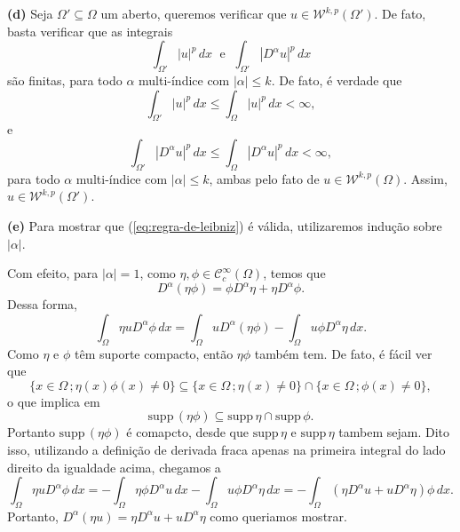 \documentclass[a4paper, 11pt]{book}
\theoremstyle{definition}
\newcommand{\cC}{\mathcal{C}}
\newcommand{\cW}{\mathcal{W}}
\newcommand{\supp}{\mathrm{supp}\,}
\begin{document}
\begin{prf}
    \textbf{(d)} Seja $\Omega' \subseteq \Omega$ um aberto, queremos verificar que $u \in \cW^{k,p}(\Omega')$.
    De fato, basta verificar que as integrais
    \[
        \int_{\Omega'} |u|^p \, dx \;\text{ e }\; \int_{\Omega'} |D^{\alpha}u|^p \, dx
    \]
    são finitas, para todo $\alpha$ multi-índice com $|\alpha| \leqslant k$. De fato, é verdade que
    \[
        \int_{\Omega'} |u|^p \, dx \leqslant \int_{\Omega} |u|^p \,dx < \infty,
    \]
    e
    \[
        \int_{\Omega'} |D^\alpha u|^p \, dx \leqslant \int_{\Omega} |D^\alpha u|^p \,dx < \infty,
    \]
    para todo $\alpha$ multi-índice com $|\alpha| \leqslant k$, ambas pelo fato de $u \in \cW^{k,p}(\Omega)$.
    Assim, $u \in \cW^{k,p}(\Omega')$.

    \textbf{(e)} Para mostrar que (\ref{eq:regra-de-leibniz}) é válida, utilizaremos indução sobre $|\alpha|$. 
    
    Com efeito, para $|\alpha|= 1$, como $\eta,\phi \in \cC^{\infty}_c(\Omega)$, temos que
    \[
        D^{\alpha} (\eta \phi) = \phi D^{\alpha}\eta + \eta D^{\alpha} \phi.
    \]
    Dessa forma,
    \[
        \int_\Omega \eta u D^{\alpha} \phi \, dx = \int_\Omega u D^{\alpha} (\eta \phi) - \int_\Omega u\phi D^{\alpha} \eta \, dx.
    \]
    Como $\eta$ e $\phi$ têm suporte compacto, então $\eta\phi$ também tem.
    De fato, é fácil ver que
    \[
        \{x \in \Omega \,; \eta(x)\phi(x) \neq 0\} \subseteq \{x \in \Omega \,; \eta(x) \neq 0\} \cap \{x \in \Omega \,; \phi(x) \neq 0\},
    \] 
    o que implica em
    \[
        \supp(\eta\phi) \subseteq \supp \eta \cap \supp \phi.
    \]
    Portanto $\supp(\eta\phi)$ é comapcto, desde que $\supp \eta$ e $\supp \eta$ tambem sejam.
    Dito isso, utilizando a definição de derivada fraca apenas na primeira integral do lado direito da igualdade acima, chegamos a
    \[
        \int_\Omega \eta u D^{\alpha} \phi \, dx = -\int_\Omega \eta \phi D^{\alpha} u \, dx - \int_\Omega u\phi D^{\alpha} \eta \, dx = -\int_\Omega (\eta D^{\alpha}u + uD^{\alpha}\eta) \phi \,dx.
    \]
    Portanto, $D^{\alpha}(\eta u) = \eta D^{\alpha}u + uD^{\alpha}\eta$ como queriamos mostrar.


\end{prf}
\end{document}
